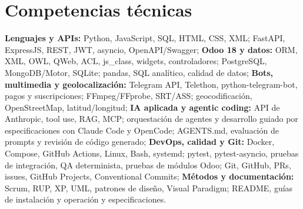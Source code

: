 \section{Competencias técnicas}

{\small
\textbf{Lenguajes y APIs:} Python, JavaScript, SQL, HTML, CSS, XML; FastAPI, ExpressJS, REST, JWT, asyncio, \mbox{OpenAPI/Swagger}; \textbf{Odoo 18 y datos:} ORM, XML, OWL, QWeb, ACL, \mbox{js\_class}, widgets, controladores; PostgreSQL, \mbox{MongoDB/Motor}, SQLite; pandas, SQL analítico, calidad de datos; \textbf{Bots, multimedia y geolocalización:} Telegram API, Telethon, \mbox{python-telegram-bot}, pagos y suscripciones; \mbox{FFmpeg/FFprobe}, \mbox{SRT/ASS}; geocodificación, \mbox{OpenStreetMap}, latitud/longitud; \textbf{IA aplicada y agentic coding:} API de Anthropic, tool use, RAG, MCP; orquestación de agentes y desarrollo guiado por especificaciones con Claude Code y OpenCode; AGENTS.md, evaluación de prompts y revisión de código generado; \textbf{DevOps, calidad y Git:} Docker, Compose, GitHub Actions, Linux, Bash, \mbox{systemd}; pytest, \mbox{pytest-asyncio}, pruebas de integración, QA determinista, pruebas de módulos Odoo; Git, GitHub, PRs, issues, GitHub Projects, Conventional Commits; \textbf{Métodos y documentación:} Scrum, RUP, XP, UML, patrones de diseño, Visual Paradigm; README, guías de instalación y operación y especificaciones.\par
}
